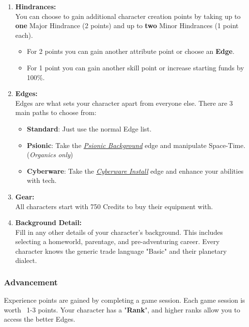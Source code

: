 \begin{enumerate}
  \item \textbf{Hindrances:}\\ You can choose to gain additional character creation points by taking up to \textbf{one} Major Hindrance (2 points) and up to \textbf{two} Minor Hindrances (1 point each).
    \begin{itemize}
        \item For 2 points you can gain another attribute point or choose an \textbf{Edge}.
        \item For 1 point you can gain another skill point or increase starting funds by 100\%.
    \end{itemize}

  \item \textbf{Edges:}\\ Edges are what sets your character apart from everyone else. There are 3 main paths to choose from:
    \begin{itemize}
        \item \textbf{Standard}: Just use the normal Edge list.
        \item \textbf{Psionic}: Take the \textit{\hyperref[sec:psionics]{Psionic Background}} edge and manipulate Space-Time. (\textit{Organics only})
        \item \textbf{Cyberware}: Take the \textit{\hyperref[sec:cyberware]{Cyberware Install}} edge and enhance your abilities with tech.
    \end{itemize}

  \item \textbf{Gear:}\\ All characters start with 750 Credits to buy their equipment with.

  \item \textbf{Background Detail:}\\ Fill in any other details of your character's background. This includes selecting a homeworld, parentage, and pre-adventuring career. Every character knows the generic trade language "Basic" and their planetary dialect.
  
\end{enumerate}

\subsubsection{Advancement}

Experience points are gained by completing a game session. Each game session is worth ~1-3 points. Your character has a "\textbf{Rank}", and higher ranks allow you to access the better Edges.

